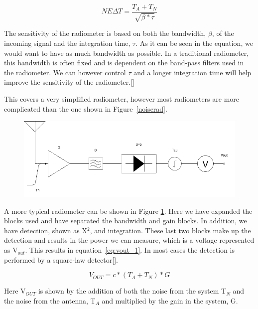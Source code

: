 \begin{equation} \label{NEAT_EQ}
NE\Delta T=\frac{T_{A}+T_{N}}{\sqrt{\beta * \tau}}
\end{equation}

The sensitivity of the radiometer is based on both the bandwidth, $\beta$, of the incoming signal and the integration time, $\tau$.  As it can be seen in the equation, we would want to have as much bandwidth as possible.  In a traditional radiometer, this bandwidth is often fixed and is dependent on the band-pass filters used in the radiometer.  We can however control $\tau$ and a longer integration time will help improve the sensitivity of the radiometer.[\cite{ulaby}]

This covers a very simplified radiometer, however most radiometers are more complicated than the one shown in Figure~\ref{noiserad}.

{\begin{figure}[h!tb] 
\centering
\includegraphics[width=\textwidth]{Images/Radiometer.png}
\label{trad_radiometer}
\end{figure}
}

A more typical radiometer can be shown in Figure \ref{trad_radiometer}.  Here we have expanded the blocks used and have separated the bandwidth and gain blocks.  In addition, we have detection, shown as X$^2$, and integration.  These last two blocks make up the detection and results in the power we can measure, which is a voltage represented as V$_{out}$.  This results in equation~\ref{eq:vout_1}.  In most cases the detection is performed by a square-law detector[\cite{Leinweber}].

\begin{equation} \label{eq:vout_1}
V_{OUT}=c*(T_A+T_N)*G
\end{equation}

Here V$_{OUT}$ is shown by the addition of both the noise from the system T$_N$ and the noise from the antenna, T$_A$ and multiplied by the gain in the system, G.

